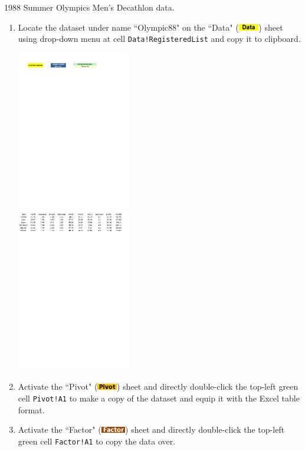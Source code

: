 \documentclass[article]{jss}
\newcommand{\shtData}{``Data" (\includegraphics[height=8pt, keepaspectratio=true]{DataSheetTab_png}) }
\newcommand{\shtPivot}{``Pivot" (\includegraphics[height=8pt, keepaspectratio=true]{PivotSheetTab_png}) }
\newcommand{\shtFactor}{``Factor" (\includegraphics[height=8pt, keepaspectratio=true]{FactorSheetTab_png}) }
\begin{document}
        1988 Summer Olympics Men's Decathlon data. 
        \begin{enumerate}
          \item Locate the dataset under name ``Olympic88" on the \shtData sheet using drop-down menu at cell \texttt{Data!RegisteredList} and copy it to clipboard.
          \begin{center}
            \includegraphics[height=200pt, keepaspectratio=true]{img/DataSheet_Olympic88_Selector}\\
            \includegraphics[height=200pt, keepaspectratio=true]{img/DataSheet_Olympic88_Data}
          \end{center}
          \item Activate the \shtPivot sheet and directly double-click the top-left green cell \texttt{Pivot!A1} to make a copy of the dataset and equip it with the Excel table format.
          \item Activate the \shtFactor sheet and directly double-click the top-left green cell \texttt{Factor!A1} to copy the data over.
          \begin{center}

\end{center}
\end{enumerate}
\end{document}

